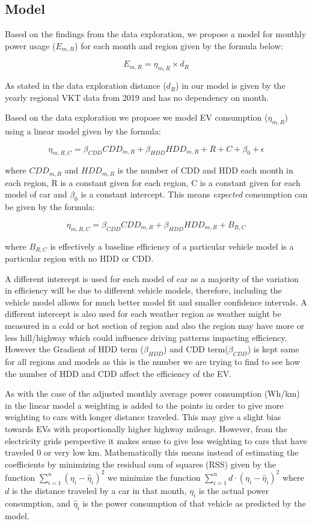 \documentclass[
]{article}
\begin{document}
\hypertarget{model}{%
\subsection{Model}\label{model}}

Based on the findings from the data exploration, we propose a model for
monthly power usage (\(E_{m,R}\)) for each month and region given by the
formula below:

\[ E_{m,R} = \eta_{m,R} \times d_{R}\]

As stated in the data exploration distance (\(d_{R}\)) in our model is
given by the yearly regional VKT data from 2019 and has no dependency on
month.

Based on the data exploration we propose we model EV consumption
(\(\eta_{m,R}\)) using a linear model given by the formula:

\[ \eta_{m,R,C} = \beta_{CDD}{CDD}_{m,R} + \beta_{HDD}{HDD}_{m,R} + R + C + \beta_0 + \epsilon \]

where \({CDD}_{m,R}\) and \({HDD}_{m,R}\) is the number of CDD and HDD
each month in each region, R is a constant given for each region, C is a
constant given for each model of car and \(\beta_0\) is a constant
intercept. This means \emph{expected} consumption can be given by the
formula:

\[ \eta_{m,R,C} = \beta_{CDD}{CDD}_{m,R} + \beta_{HDD}{HDD}_{m,R} + B_{R,C} \]

where \(B_{R,C}\) is effectively a baseline efficiency of a particular
vehicle model is a particular region with no HDD or CDD.

A different intercept is used for each model of car as a majority of the
variation in efficiency will be due to different vehicle models,
therefore, including the vehicle model allows for much better model fit
and smaller confidence intervals. A different intercept is also used for
each weather region as weather might be measured in a cold or hot
section of region and also the region may have more or less hill/highway
which could influence driving patterns impacting efficiency. However the
Gradient of HDD term (\(\beta_{HDD}\)) and CDD term(\(\beta_{CDD}\)) is
kept same for all regions and models as this is the number we are trying
to find to see how the number of HDD and CDD affect the efficiency of
the EV.

As with the case of the adjusted monthly average power consumption
(Wh/km) in the linear model a weighting is added to the points in order
to give more weighting to cars with longer distance traveled. This may
give a slight bias towards EVs with proportionally higher highway
mileage. However, from the electricity grids perspective it makes sense
to give less weighting to cars that have traveled 0 or very low km.
Mathematically this means instead of estimating the coefficients by
minimizing the residual sum of squares (RSS) given by the function
\(\sum_{i =1}^{n}(\eta_{i}-\hat{\eta}_{i})^2\) we minimize the function
\(\sum_{i =1}^{n}d \cdot(\eta_{i}-\hat{\eta}_{i})^2\) where \(d\) is the
distance traveled by a car in that month, \(\eta_{i}\) is the actual
power consumption, and \(\hat{\eta}_{i}\) is the power consumption of
that vehicle as predicted by the model.
\end{document}
